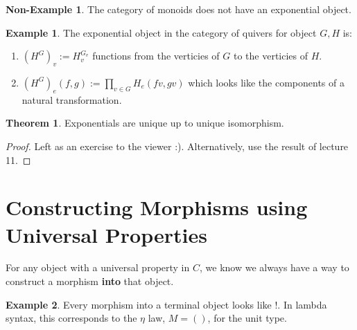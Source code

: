 \documentclass[12pt]{article}
\theoremstyle{definition}
\newtheorem{theorem}{Theorem}[section]
\newtheorem{example}{Example}[section]
\newtheorem{nonexample}{Non-Example}[section]
\begin{document}
\begin{nonexample}
    The category of monoids does not have an exponential object.

\end{nonexample}

\begin{example}
    The exponential object in the category of quivers for object $G,H$ is:
    \begin{enumerate}
        \item $(H^G)_v := H_v^{G_v}$  functions from the verticies of $G$ to the verticies of $H$.
        \item $(H^G)_e(f,g):= \prod_{v \in G}H_e(fv,gv)$ which looks like the components of a natural transformation.
    \end{enumerate}
\end{example}


\begin{theorem}
    Exponentials are unique up to unique isomorphism.
\end{theorem}

\begin{proof}
    Left as an exercise to the viewer :). Alternatively, use the result of lecture 11.
\end{proof}

\section{Constructing Morphisms using Universal Properties}
For any object with a universal property in $C$, we know we always have a way to construct a morphism \textbf{into} that object. 
\begin{example}
    Every morphism into a terminal object looks like $!$.
    In lambda syntax, this corresponds to the $\eta$ law, $M = ()$, for the unit type.

    \begin{figure}[!h]
    \centering

\end{figure}


\end{example}
\end{document}
